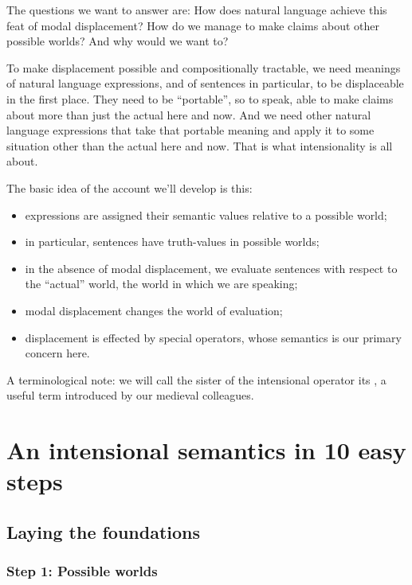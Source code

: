 The questions we want to answer are: %
How does natural language achieve this feat of modal displacement? How do we
manage to make claims about other possible worlds? And why would we want to?

To make displacement possible and compositionally tractable, we need meanings of
natural language expressions, and of sentences in particular, to be displaceable
in the first place. They need to be ``portable'', so to speak, able to make
claims about more than just the actual here and now. And we need other
natural language expressions that take that portable meaning and apply it to
some situation other than the actual here and now. That is what intensionality
is all about.

The basic idea of the account we'll develop is this:

\begin{itemize}
\item expressions are assigned their semantic values relative to a possible
  world;
\item in particular, sentences have truth-values in possible worlds;
\item in the absence of modal displacement, we evaluate sentences with respect
  to the ``actual'' world, the world in which we are speaking;
\item modal displacement changes the world of evaluation;
\item displacement is effected by special operators, whose semantics is our
  primary concern here.
\end{itemize}
%
A terminological note: we will call the sister of the intensional operator its
, a useful term introduced by our medieval colleagues.

\section{An intensional semantics in 10 easy steps}\label{sec:10-steps}

\subsection{Laying the foundations} \label{sec:laying-foundations}

\subsubsection{Step 1: Possible worlds} \label{sec:world-parameter}

